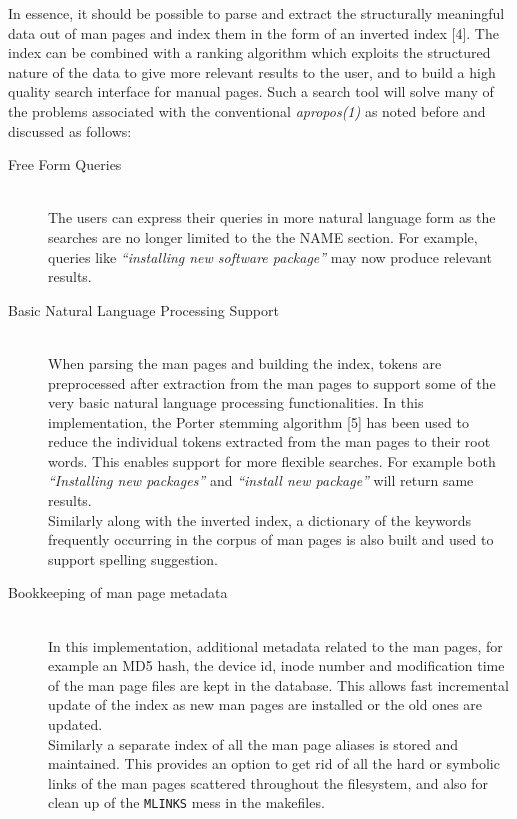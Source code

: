 \documentclass[letterpaper,twocolumn,10pt]{article}
\begin{document}
In essence, it should be possible
to parse and extract the structurally meaningful data
out of man pages and index them in the form of an inverted index [4]. The index
can be combined with a ranking algorithm which exploits the structured nature of
the
data to give more relevant results to the user, and to build a
high quality search interface for manual pages.
Such a search tool will solve many of the problems associated with the conventional \textit{apropos(1)} as noted
before and discussed as follows: \\

\begin{description}
\item[Free Form Queries] \hfill \\
The users can express their queries in more natural language form as the searches
are no longer limited to the the NAME section.
For example, queries like \textit{``installing new software package''} may
now produce relevant results.
\end{description}
\begin{description}
\item[Basic Natural Language Processing Support] \hfill \\
When parsing the man pages and building the index, tokens are preprocessed after
extraction from the man pages to support some of the very
basic natural language processing functionalities. In this implementation, the
Porter stemming algorithm [5] has been used to
reduce the individual tokens extracted from the man pages to their root words.
This enables support for more flexible searches. For example both
\textit{``Installing new packages''} and \textit{``install new package''} will
return same results. \\

Similarly along with the inverted index, a dictionary of the keywords frequently
occurring in the corpus of man pages is also built and used to support
spelling suggestion.
\end{description}
\begin{description}
\item[Bookkeeping of man page metadata] \hfill \\
In this implementation, additional metadata related to the man pages, for example
an MD5 hash, the device id, inode number and modification time
of the man page files are kept in the database.
This allows fast incremental update of the index as new man pages are installed or the old ones are updated. \\

Similarly a separate index of all the man page aliases is stored and maintained.
This provides an option to get rid of all the hard or symbolic links of the man
pages scattered throughout the filesystem, and also for clean up of the
{\tt MLINKS} mess in the makefiles.
\end{description}
\end{document}
